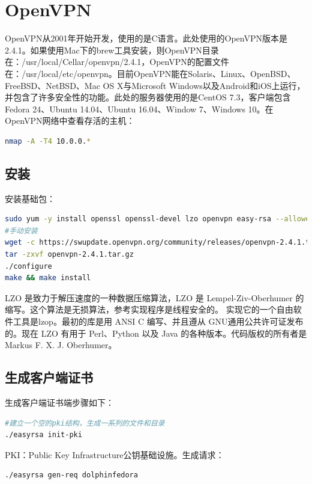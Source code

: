 \documentclass[letter]{book}
\begin{document}
\section{OpenVPN}

OpenVPN从2001年开始开发，使用的是C语言。此处使用的OpenVPN版本是2.4.1。如果使用Mac下的brew工具安装，则OpenVPN目录在：/usr/local/Cellar/openvpn/2.4.1，OpenVPN的配置文件在：/usr/local/etc/openvpn。目前OpenVPN能在Solaris、Linux、OpenBSD、FreeBSD、NetBSD、Mac OS X与Microsoft Windows以及Android和iOS上运行，并包含了许多安全性的功能。此处的服务器使用的是CentOS 7.3，客户端包含Fedora 24、Ubuntu 14.04、Ubuntu 16.04、Window 7、Windows 10。在OpenVPN网络中查看存活的主机：

\begin{lstlisting}[language=bash]
nmap -A -T4 10.0.0.*
\end{lstlisting}

\subsection{安装}

安装基础包：

\begin{lstlisting}[language=bash]
sudo yum -y install openssl openssl-devel lzo openvpn easy-rsa --allowerasing
#手动安装
wget -c https://swupdate.openvpn.org/community/releases/openvpn-2.4.1.tar.gz
tar -zxvf openvpn-2.4.1.tar.gz
./configure
make && make install
\end{lstlisting}

LZO 是致力于解压速度的一种数据压缩算法，LZO 是 Lempel-Ziv-Oberhumer 的缩写。这个算法是无损算法，参考实现程序是线程安全的。 实现它的一个自由软件工具是lzop。最初的库是用 ANSI C 编写、并且遵从 GNU通用公共许可证发布的。现在 LZO 有用于 Perl、Python 以及 Java 的各种版本。代码版权的所有者是 Markus F. X. J. Oberhumer。

\subsection{生成客户端证书}

生成客户端证书端步骤如下：

\begin{lstlisting}[language=Bash]
#建立一个空的pki结构，生成一系列的文件和目录
./easyrsa init-pki
\end{lstlisting}

PKI：Public Key Infrastructure公钥基础设施。生成请求：

\begin{lstlisting}[language=Bash]
./easyrsa gen-req dolphinfedora
\end{lstlisting}
\end{document}
